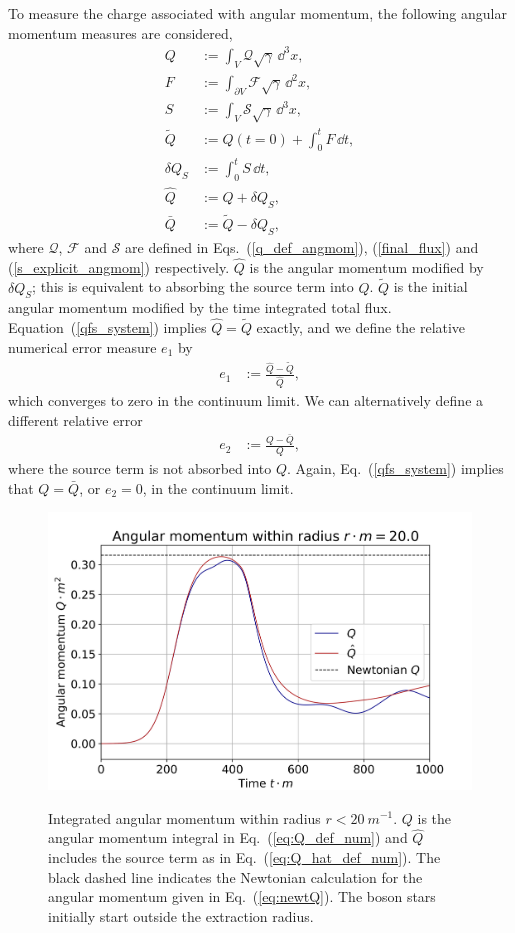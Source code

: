 To measure the charge associated with angular momentum, the following angular momentum measures are considered,
\begin{align}
\label{eq:Q_def_num}Q &:= \int_V \mathcal{Q} \sqrt{\gamma}\,\dd^3 x, \\
\label{eq:F_def_num}F &:= \int_{\partial V} \mathcal{F}\sqrt{\gamma}\,\dd^2 x,\\
\label{eq:S_def_num}S &:= \int_V \mathcal{S} \sqrt{\gamma}\,\dd^3 x , \\
\tilde{Q} &:= Q(t=0) + \int_0^{t} F \,\dd t, \\
\delta Q_S &:= \int_0^{t}S\,\dd t, \\
\label{eq:Q_hat_def_num}\hat{Q}&:= Q + \delta Q_S, \\
\bar{Q}&:= \tilde{Q} - \delta Q_S,
\end{align}
where $\mathcal{Q}$, $\mathcal{F}$ and $\mathcal{S}$ are defined in Eqs.~(\ref{q_def_angmom}), (\ref{final_flux}) and (\ref{s_explicit_angmom}) respectively. $\hat{Q}$ is the angular momentum modified by $\delta Q_S$; this is equivalent to absorbing the source term into $Q$. $\tilde{Q}$ is the initial angular momentum modified by the time integrated total flux. Equation~(\ref{qfs_system}) implies $\hat{Q}=\tilde{Q}$ exactly, and we define the relative numerical error measure $e_1$ by
\begin{align}\label{eq:r1def}
e_1&:= \frac{\hat{Q}-\tilde{Q}}{\hat{Q}},
\end{align}
which converges to zero in the continuum limit. We can alternatively define a different relative error
\begin{align}\label{eq:r2def}
e_2&:= \frac{{Q}-\bar{Q}}{{Q}},
\end{align}
where the source term is not absorbed into $Q$. Again, Eq.~(\ref{qfs_system}) implies that $Q = \bar{Q}$, or $e_2=0$, in the continuum limit.

\begin{figure}[h!]
{\includegraphics[width=0.9\columnwidth]{png/Qplot_20.0.png}}
\caption{ Integrated angular momentum within radius $r<20 ~m^{-1}$. $Q$ is the  angular momentum integral in Eq.~(\ref{eq:Q_def_num}) and $\hat{Q}$ includes the source term as in Eq.~(\ref{eq:Q_hat_def_num}). The black dashed line indicates the Newtonian calculation for the angular momentum given in Eq.~(\ref{eq:newtQ}). The boson stars initially start outside the extraction radius. }
\label{fig:Q_20}
\end{figure}

